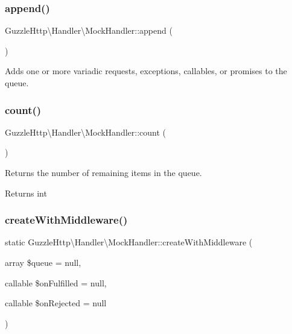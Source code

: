 \subsubsection{\texorpdfstring{append()}{append()}}
{\footnotesize\ttfamily Guzzle\+Http\textbackslash{}\+Handler\textbackslash{}\+Mock\+Handler\+::append (\begin{DoxyParamCaption}{ }\end{DoxyParamCaption})}

Adds one or more variadic requests, exceptions, callables, or promises to the queue. \mbox{\label{classGuzzleHttp_1_1Handler_1_1MockHandler_a8c1b39b146048819e507b8529f4e84c9}} 
\subsubsection{\texorpdfstring{count()}{count()}}
{\footnotesize\ttfamily Guzzle\+Http\textbackslash{}\+Handler\textbackslash{}\+Mock\+Handler\+::count (\begin{DoxyParamCaption}{ }\end{DoxyParamCaption})}

Returns the number of remaining items in the queue.

\begin{DoxyReturn}{Returns}
int 
\end{DoxyReturn}
\mbox{\label{classGuzzleHttp_1_1Handler_1_1MockHandler_a1178d28f3c427638cd7157f753fd2e36}} 
\subsubsection{\texorpdfstring{create\+With\+Middleware()}{createWithMiddleware()}}
{\footnotesize\ttfamily static Guzzle\+Http\textbackslash{}\+Handler\textbackslash{}\+Mock\+Handler\+::create\+With\+Middleware (\begin{DoxyParamCaption}\item[{array}]{\$queue = {\ttfamily null},  }\item[{callable}]{\$on\+Fulfilled = {\ttfamily null},  }\item[{callable}]{\$on\+Rejected = {\ttfamily null} }\end{DoxyParamCaption})\hspace{0.3cm}{\ttfamily [static]}}

